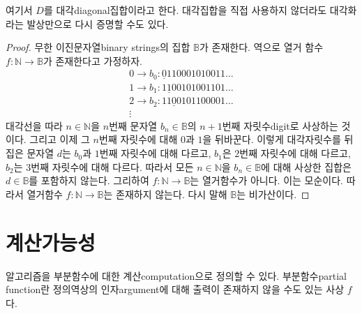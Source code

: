 \documentclass[a4paper,chapter,atbegshi]{oblivoir}
\begin{document}
여기서 $D$를 대각{\tiny diagonal}집합이라고 한다. 대각집합을 직접 사용하지
않더라도 대각화라는 발상만으로 다시 증명할 수도 있다.
\begin{proof}
  무한 이진문자열{\tiny binary strings}의 집합 $\mathbb{B}$가 존재한다.
  역으로 열거 함수 $f:\mathbb{N}\rightarrow\mathbb{B}$가 존재한다고 가정하자.
  \[
    \begin{matrix}
      0\rightarrow b_0:\underline{0}110001010011\ldots\\
      1\rightarrow b_1:1\underline{1}00101001101\ldots\\
      2\rightarrow b_2:11\underline{0}0101100001\ldots\\
      \vdots
    \end{matrix}
  \]
  대각선을 따라 $n\in\mathbb{N}$을 $n$번째 문자열 $b_n\in\mathbb{B}$의 $n+1$번째
  자릿수{\tiny digit}로 사상하는 것이다. 그리고 이제 그 $n$번째 자릿수에 대해
  $0$과 $1$을 뒤바꾼다. 이렇게 대각자릿수를 뒤집은 문자열 $d$는 $b_0$과 $1$번째
  자릿수에 대해 다르고, $b_1$은 $2$번째 자릿수에 대해 다르고, $b_2$는 $3$번째
  자릿수에 대해 다르다. 따라서 모든 $n\in\mathbb{N}$을 $b_n\in\mathbb{B}$에
  대해 사상한 집합은 $d\in\mathbb{B}$를 포함하지 않는다. 그리하여 $f:\mathbb{N}
  \rightarrow\mathbb{B}$는 열거함수가 아니다. 이는 모순이다. 따라서 
  열거함수 $f:\mathbb{N}\rightarrow\mathbb{B}$는 존재하지 않는다. 다시 말해
  $\mathbb{B}$는 비가산이다.
\end{proof}
\section{계산가능성}
알고리즘을 부분함수에 대한 계산{\tiny computation}으로 정의할 수 있다. 
부분함수{\tiny partial function}란 정의역상의 인자{\tiny argument}에 대해
출력이 존재하지 않을 수도 있는 사상 $f$다.
\end{document}
